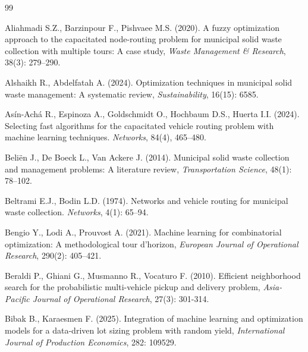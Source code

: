 \documentclass[authoryear,preprint,12pt]{elsarticle}
\begin{document}

\begin{thebibliography}{99}
%


Aliahmadi S.Z., Barzinpour F., Pishvaee M.S. (2020). A fuzzy optimization approach to the capacitated node-routing problem for municipal solid waste collection with multiple tours: A case study, \textit{Waste Management \& Research}, 38(3): 279--290.  

Alshaikh R., Abdelfatah A. (2024). Optimization techniques in municipal solid waste management: A systematic review, \textit{Sustainability}, 16(15): 6585. 

As\'in-Ach\'a R., Espinoza A., Goldschmidt O., Hochbaum D.S., Huerta I.I. (2024).
Selecting fast algorithms for the capacitated vehicle routing problem with machine learning techniques.
\textit{Networks}, 84(4), 465--480.

Beliën J., De Boeck L., Van Ackere J. (2014). Municipal solid waste collection and management problems: A literature review, \textit{Transportation Science}, 48(1): 78--102.

Beltrami E.J., Bodin L.D. (1974). Networks and vehicle routing for municipal waste collection. \textit{Networks}, 4(1): 65--94.

Bengio Y., Lodi A., Prouvost A. (2021). Machine learning for combinatorial optimization: A methodological tour d'horizon, \textit{European Journal of Operational Research}, 290(2): 405--421. 

Beraldi P., Ghiani G., Musmanno R., Vocaturo F. (2010). Efficient neighborhood search for the probabilistic multi-vehicle pickup and delivery problem, \textit{Asia-Pacific Journal of Operational Research}, 27(3): 301-314.

Bibak B., Karaesmen F. (2025). Integration of machine learning and optimization models for a data-driven lot sizing problem with random yield,  \textit{International Journal of Production Economics}, 282: 109529.


\end{thebibliography}
\end{document}
